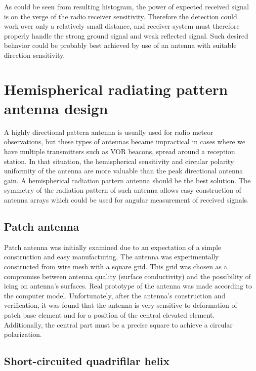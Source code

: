 \documentclass[twoside]{ctuthesis}
\theoremstyle{plain}
\theoremstyle{definition}
\theoremstyle{note}
\begin{document}
As could be seen from resulting histogram, the power of expected received signal is on the verge of the radio receiver sensitivity. Therefore the detection could work over only a relatively small distance, and receiver system must therefore properly handle the strong ground signal and weak reflected signal. Such desired behavior could be probably best achieved by use of an antenna with suitable direction sensitivity.

\section{Hemispherical radiating pattern antenna design}

A highly directional pattern antenna is usually used for radio meteor observations, but these types of antennas became impractical in cases where we have multiple transmitters such as VOR beacons, spread around a reception station. In that situation, the hemispherical sensitivity and circular polarity uniformity of the antenna are more valuable than the peak directional antenna gain. A hemispherical radiation pattern antenna should be the best solution.  The symmetry of the radiation pattern of such antenna allows easy construction of antenna arrays which could be used for angular measurement of received signals.

\subsection{Patch antenna}

Patch antenna was initially examined due to an expectation of a simple construction and easy manufacturing. The antenna was experimentally constructed from wire mesh with a square grid. This grid was chosen as a compromise between antenna quality (surface conductivity)  and the possibility of icing on antenna’s surfaces. Real prototype of the antenna was made according to the computer model. Unfortunately, after the antenna’s construction and verification, it was found that the antenna is very sensitive to deformation of patch base element and for a position of the central elevated element. Additionally, the central part must be a precise square to achieve a circular polarization. 

\subsection{Short-circuited quadrifilar helix}
\end{document}

